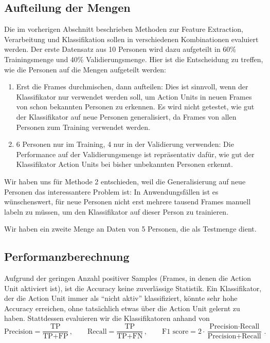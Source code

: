 \subsection{Aufteilung der Mengen}
Die im vorherigen Abschnitt beschrieben Methoden zur Feature Extraction,
Verarbeitung und Klassifikation sollen in verschiedenen Kombinationen evaluiert
werden. Der erste Datensatz aus 10 Personen wird dazu aufgeteilt in 60\%
Trainingsmenge und 40\% Validierungsmenge. Hier ist die Entscheidung zu treffen,
wie die Personen auf die Mengen aufgeteilt werden:
\begin{enumerate}
\item Erst die Frames durchmischen, dann aufteilen: Dies ist sinnvoll, wenn der
  Klassifikator nur verwendet werden soll, um Action Units in neuen Frames von schon bekannten
  Personen zu erkennen. Es wird nicht getestet, wie gut der Klassifikator auf
  neue Personen generalisiert, da Frames von allen Personen zum Training verwendet werden.
  \item 6 Personen nur im Training, 4 nur in der Validierung verwenden: Die
    Performance auf der Validierungsmenge ist repräsentativ dafür, wie gut der
    Klassifikator Action Units bei bisher unbekannten Personen erkennt.
\end{enumerate}
Wir haben uns für Methode 2 entschieden, weil
die Generalisierung auf neue Personen das interessantere Problem ist: In
Anwendungsfällen ist es wünschenswert, für neue Personen nicht erst mehrere
tausend Frames manuell labeln zu müssen, um den Klassifikator auf dieser Person
zu trainieren.

Wir haben ein zweite Menge an Daten von 5 Personen, die als Testmenge dient.
\subsection{Performanzberechnung}
Aufgrund der geringen Anzahl positiver Samples (Frames, in denen die Action Unit
aktiviert ist), ist die Accuracy keine zuverlässige Statistik. Ein Klassifikator,
der die Action Unit immer als "`nicht aktiv"' klassifiziert, könnte sehr hohe
Accuracy erreichen, ohne tatsächlich etwas über die Action Unit gelernt zu haben.
Stattdessen evaluieren wir die Klassifikatoren anhand von
\begin{equation*}
  \text{Precision}=\frac{\text{TP}}{\text{TP}+\text{FP}}\,, \qquad \text{Recall}=\frac{\text{TP}}{\text{TP}+\text{FN}}\,, \qquad \text{F1 score}=2\cdot\frac{\text{Precision}\cdot\text{Recall}}{\text{Precision}+\text{Recall}}\,.
\end{equation*}

